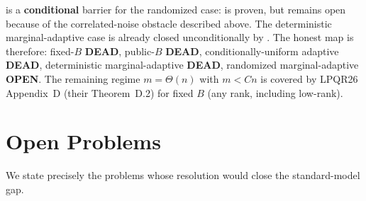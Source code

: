\documentclass[11pt,a4paper]{article}
\theoremstyle{plain}
\theoremstyle{definition}
\begin{document}
 is a \textbf{conditional} barrier for the randomized case:  is proven, but  remains open because of the correlated-noise obstacle described above.  The deterministic marginal-adaptive case is already closed unconditionally by .  The honest map is therefore: fixed-$B$ \textbf{DEAD}, public-$B$ \textbf{DEAD}, conditionally-uniform adaptive \textbf{DEAD}, deterministic marginal-adaptive \textbf{DEAD}, randomized marginal-adaptive \textbf{OPEN}.  The remaining regime $m=\Theta(n)$ with $m<Cn$ is covered by LPQR26 Appendix~D (their Theorem~D.2) for fixed $B$ (any rank, including low-rank).

\section{Open Problems}
\label{sec:open}

We state precisely the problems whose resolution would close the standard-model gap.
\end{document}
